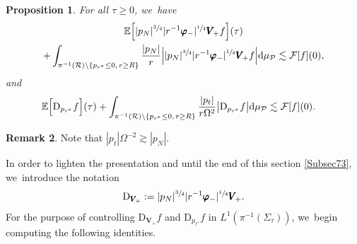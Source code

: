 \documentclass[10pt]{amsart}
\theoremstyle{plain}
\newtheorem{proposition}{Proposition}[section]
\theoremstyle{definition}
\newtheorem{remark}[proposition]{Remark}
\newcommand\dr{{\mathrm{d}}}
\begin{document}
\begin{proposition}\label{ProestivarphiminusVminus}
For all $\tau \geq 0$, we~have
\begin{multline*}
\mathbb{E} \Bigl[ |p_N|^{\sfrac{3}{4}} |r^{-1} \pmb{\varphi}_-|^{\sfrac{1}{4}} \pmb{V}_{\! +} f \Bigr](\tau) \\
 + \int_{\pi^{-1}(\mathcal{R})\setminus \{ p_{r^*} \leq 0, \, r \geq R \} } \frac{|p_N|}{r} \Big| |p_N|^{\sfrac{3}{4}} |r^{-1} \pmb{\varphi}_-|^{\sfrac{1}{4}} \pmb{V}_{\! +} f \Big| \dr \mu_{\mathcal{P}} \lesssim \mathcal{F}[f](0),
\end{multline*}
and
\begin{align*}
& \mathbb{E} \Bigl[ \mathrm{D}_{p_{r^*}} f \Bigr](\tau)+ \int_{\pi^{-1}(\mathcal{R})\setminus \{ p_{r^*} \leq 0, \, r \geq R \} } \frac{|p_t|}{r\Omega^2} \big|\mathrm{D}_{p_{r^*}} f \big| \dr \mu_{\mathcal{P}}\lesssim \mathcal{F}[f](0).
\end{align*}
\end{proposition}
\begin{remark}
Note that $|p_t|\Omega^{-2} \gtrsim |p_N|$.
\end{remark}

In order to lighten the presentation and until the end of this section \ref{Subsec73}, we~introduce the notation
\[
\mathrm{D}_{\pmb{V}_{\!+}} := |p_N|^{\sfrac{3}{4}} |r^{-1} \pmb{\varphi}_-|^{\sfrac{1}{4}} \pmb{V}_{\! +}.
\]
For the purpose of controlling $\mathrm{D}_{\pmb{V}_{\!+}} f$ and $\mathrm{D}_{p_{r^*}} f$ in $L^1(\pi^{-1}(\Sigma_\tau))$, we~begin computing the following identities.
\end{document}

